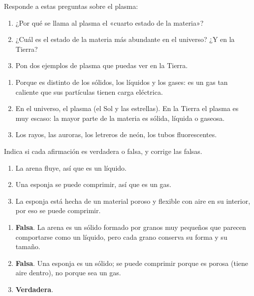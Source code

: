 \begin{exercise}
    Responde a estas preguntas sobre el plasma:
    \begin{enumerate}[label=\letraminuscula]
        \item ¿Por qué se llama al plasma el «cuarto estado de la materia»?
        \item ¿Cuál es el estado de la materia más abundante en el universo? ¿Y en la Tierra?
        \item Pon dos ejemplos de plasma que puedas ver en la Tierra.
    \end{enumerate}
    \begin{solu}
        \begin{enumerate}[label=\alph*)]
            \item Porque es distinto de los sólidos, los líquidos y los gases: es un gas tan caliente que sus partículas tienen carga eléctrica.
            \item En el universo, el plasma (el Sol y las estrellas). En la Tierra el plasma es muy escaso: la mayor parte de la materia es sólida, líquida o gaseosa.
            \item Los rayos, las auroras, los letreros de neón, los tubos fluorescentes.
        \end{enumerate}
    \end{solu}
\end{exercise}

\begin{exercise}
    Indica si cada afirmación es verdadera o falsa, y corrige las falsas.
    \begin{enumerate}[label=\letraminuscula]
        \item La arena fluye, así que es un líquido.
        \item Una esponja se puede comprimir, así que es un gas.
        \item La esponja está hecha de un material poroso y flexible con aire en su interior, por eso se puede comprimir.
    \end{enumerate}
    \begin{solu}
        \begin{enumerate}[label=\alph*)]
            \item \textbf{Falsa}. La arena es un sólido formado por granos muy pequeños que parecen comportarse como un líquido, pero cada grano conserva su forma y su tamaño.
            \item \textbf{Falsa}. Una esponja es un sólido; se puede comprimir porque es porosa (tiene aire dentro), no porque sea un gas.
            \item \textbf{Verdadera}.
        \end{enumerate}
    \end{solu}
\end{exercise}

